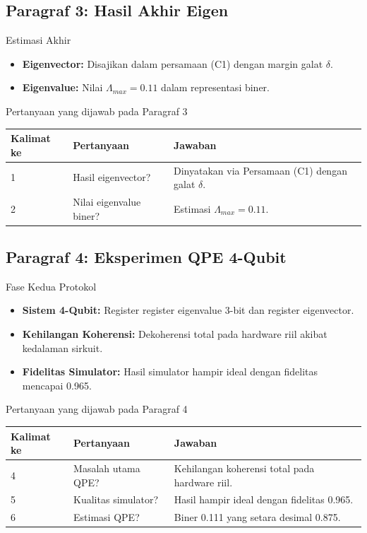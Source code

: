 \subsection{Paragraf 3: Hasil Akhir Eigen}
\begin{frame}{Estimasi Akhir}
    \begin{itemize}
        \item \textbf{Eigenvector:} Disajikan dalam persamaan (C1) dengan margin galat $\delta$.
        \item \textbf{Eigenvalue:} Nilai $\Lambda_{max} = 0.11$ dalam representasi biner.
    \end{itemize}
\end{frame}

\begin{frame}{Pertanyaan yang dijawab pada Paragraf 3}
    \centering
    \small
    \begin{tabular}{lp{4.5cm}p{6cm}}
        \toprule
        Kalimat ke & Pertanyaan & Jawaban \\
        \midrule
        1 & Hasil eigenvector? & Dinyatakan via Persamaan (C1) dengan galat $\delta$. \\
        2 & Nilai eigenvalue biner? & Estimasi $\Lambda_{max} = 0.11$. \\
        \bottomrule
    \end{tabular}
\end{frame}

\subsection{Paragraf 4: Eksperimen QPE 4-Qubit}
\begin{frame}{Fase Kedua Protokol}
    \begin{itemize}
        \item \textbf{Sistem 4-Qubit:} Register register eigenvalue 3-bit dan register eigenvector.
        \item \textbf{Kehilangan Koherensi:} Dekoherensi total pada hardware riil akibat kedalaman sirkuit.
        \item \textbf{Fidelitas Simulator:} Hasil simulator hampir ideal dengan fidelitas mencapai 0.965.
    \end{itemize}
\end{frame}

\begin{frame}{Pertanyaan yang dijawab pada Paragraf 4}
    \centering
    \small
    \begin{tabular}{lp{4.5cm}p{6cm}}
        \toprule
        Kalimat ke & Pertanyaan & Jawaban \\
        \midrule
        4 & Masalah utama QPE? & Kehilangan koherensi total pada hardware riil. \\
        5 & Kualitas simulator? & Hasil hampir ideal dengan fidelitas 0.965. \\
        6 & Estimasi QPE? & Biner 0.111 yang setara desimal 0.875. \\
        \bottomrule
    \end{tabular}
\end{frame}

